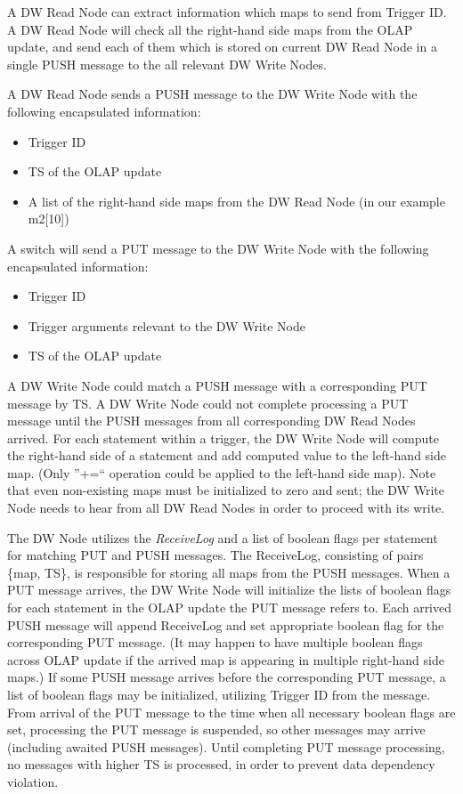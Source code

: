 \documentclass{sig-semester}
\def\OLAP{OLAP\xspace}
\begin{document}
A DW Read Node can extract information which maps to send from Trigger ID. A DW Read Node will check all the right-hand side maps from the \OLAP update, and send each of them which is stored on current DW Read Node in a single PUSH message to the all relevant DW Write Nodes.

A DW Read Node sends a PUSH message to the DW Write Node with the following encapsulated information:
\begin{itemize}
 \item Trigger ID
 \item TS of the \OLAP update
 \item A list of the right-hand side maps from the DW Read Node (in our example m2[10])
\end{itemize}

A switch will send a PUT message to the DW Write Node with the following encapsulated information:
\begin{itemize}
 \item Trigger ID
 \item Trigger arguments relevant to the DW Write Node
 \item TS of the \OLAP update
\end{itemize}

A DW Write Node could match a PUSH message with a corresponding PUT message by TS. A DW Write Node could not complete processing a PUT message until the PUSH messages from all corresponding DW Read Nodes arrived. For each statement within a trigger, the DW Write Node will compute the right-hand side of a statement and add computed value to the left-hand side map. (Only ''+=`` operation could be applied to the left-hand side map). Note that even non-existing maps must be initialized to zero and sent; the DW Write Node needs to hear from all DW Read Nodes in order to proceed with its write.

The DW Node utilizes the \textit{ReceiveLog} and a list of boolean flags per statement for matching PUT and PUSH messages. The ReceiveLog, consisting of pairs \{map, TS\}, is responsible for storing all maps from the PUSH messages. When a PUT message arrives, the DW Write Node will initialize the lists of boolean flags for each statement in the \OLAP update the PUT message refers to. Each arrived PUSH message will append ReceiveLog and set appropriate boolean flag for the corresponding PUT message. (It may happen to have multiple boolean flags across \OLAP update if the arrived map is appearing in multiple right-hand side maps.) If some PUSH message arrives before the corresponding PUT message, a list of boolean flags may be initialized, utilizing Trigger ID from the message. From arrival of the PUT message to the time when all necessary boolean flags are set, processing the PUT message is suspended, so other messages may arrive (including awaited PUSH messages). Until completing PUT message processing, no messages with higher TS is processed, in order to prevent data dependency violation.
\end{document}
